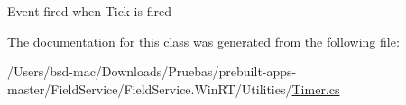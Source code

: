 Event fired when Tick is fired 



The documentation for this class was generated from the following file\+:\begin{DoxyCompactItemize}
\item 
/\+Users/bsd-\/mac/\+Downloads/\+Pruebas/prebuilt-\/apps-\/master/\+Field\+Service/\+Field\+Service.\+Win\+R\+T/\+Utilities/\hyperlink{_timer_8cs}{Timer.\+cs}\end{DoxyCompactItemize}
